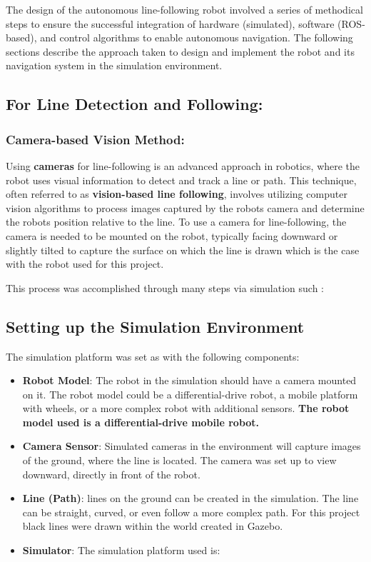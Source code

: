 \documentclass[../../main]{subfiles}
\begin{document}
    The design of the autonomous line-following robot involved a series of
    methodical steps to ensure the successful integration of hardware
    (simulated), software (ROS-based), and control algorithms to enable
    autonomous navigation. The following sections describe the approach
    taken to design and implement the robot and its navigation system in the
    simulation environment.
    
    \subsection{For Line Detection and Following:}
    
    \subsubsection{Camera-based Vision Method:}
    
    Using \textbf{cameras} for line-following is an advanced approach in
    robotics, where the robot uses visual information to detect and track a
    line or path. This technique, often referred to as \textbf{vision-based
    line following}, involves utilizing computer vision algorithms to
    process images captured by the robot\textquotesingle s camera and
    determine the robot\textquotesingle s position relative to the line. To
    use a camera for line-following, the camera is needed to be mounted on
    the robot, typically facing downward or slightly tilted to capture the
    surface on which the line is drawn which is the case with the robot used
    for this project.
    
    This process was accomplished through many steps via simulation such :
    

    \subsection*{Setting up the Simulation Environment}

    
    The simulation platform was set as with the following components:
    
    \begin{itemize}
    \item
      \textbf{Robot Model}: The robot in the simulation should have a camera
      mounted on it. The robot model could be a differential-drive robot, a
      mobile platform with wheels, or a more complex robot with additional
      sensors. \textbf{The robot model used is a differential-drive mobile
      robot.}
    \item
      \textbf{Camera Sensor}: Simulated cameras in the environment will
      capture images of the ground, where the line is located. The camera
      was set up to view downward, directly in front of the robot.
    \item
      \textbf{Line (Path)}: lines on the ground can be created in the
      simulation. The line can be straight, curved, or even follow a more
      complex path. For this project black lines were drawn within the world
      created in Gazebo.
    \item
      \textbf{Simulator}: The simulation platform used is:
    \end{itemize}
    
\end{document}
